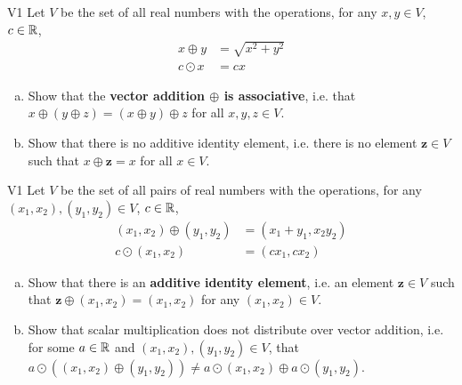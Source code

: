  \begin{problem}{V1}
 Let \(V\) be the set of all real numbers with the operations, for any \(x,y\in V\), \(c\in \mathbb{R}\),
 \begin{align*}
 x \oplus y &= \sqrt{x^2+y^2} \\
 c \odot x &= c x
 \end{align*}
 \begin{enumerate}[(a)]
 \item Show that the \textbf{vector addition \(\oplus\) is associative}, i.e. that \(x \oplus (y \oplus z)=(x\oplus y)\oplus z\) for all \(x,y,z \in V\).
       
 \item  Show that there is no additive identity element, i.e. there is no element \(\mathbf{z} \in V\) such that \(x \oplus \mathbf{z} = x\) for all \(x \in V\).
 \end{enumerate}
 \end{problem} 
 
 \begin{problem}{V1}
 Let \(V\) be the set of all pairs of real numbers with the operations, for any \((x_1,x_2), (y_1,y_2) \in V\), \(c\in \mathbb{R}\),
 \begin{align*}
 (x_1,x_2) \oplus (y_1,y_2) &= (x_1+y_1,x_2y_2) \\
 c \odot (x_1,x_2) &= (cx_1, cx_2)
 \end{align*}
 \begin{enumerate}[(a)]
 \item Show that there is an \textbf{additive identity element}, i.e. an element \(\mathbf{z} \in V\) such that \(\mathbf{z}\oplus(x_1,x_2) = (x_1,x_2)\) for any \( (x_1,x_2) \in V\).
\item Show that scalar multiplication does not distribute over vector addition, i.e. for some \(a \in \mathbb{R}\) and \( (x_1,x_2), (y_1,y_2) \in V\), that \(a \odot \left( (x_1,x_2)\oplus (y_1,y_2) \right) \neq a \odot (x_1,x_2) \oplus a \odot (y_1,y_2) \).
 \end{enumerate}
\end{problem}
